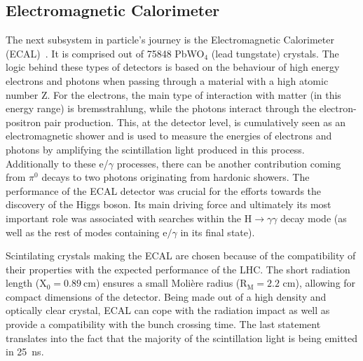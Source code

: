 \subsection{Electromagnetic Calorimeter}
\hspace{10pt} The next subsystem in particle's journey is the Electromagnetic Calorimeter (ECAL)~\cite{cms:paper}\cite{ECAL_performance}. It is comprised out of 75848 PbWO$_{\text{4}}$ (lead tungstate) crystals. The logic behind these types of detectors is based on the behaviour of high energy electrons and photons when passing through a material with a high atomic number Z. For the electrons, the main type of interaction with matter (in this energy range) is bremsstrahlung, while the photons interact through the electron-positron pair production. This, at the detector level, is cumulatively seen as an electromagnetic shower and is used to measure the energies of electrons and photons by amplifying the scintillation light produced in this process. Additionally to these e/$\gamma$ processes, there can be another contribution coming from $\pi^\text{0}$ decays to two photons originating from hardonic showers. The performance of the ECAL detector was crucial for the efforts towards the discovery of the Higgs boson. Its main driving force and ultimately its most important role was associated with searches within the $\text{H}\rightarrow \gamma\gamma$ decay mode (as well as the rest of modes containing $\text{e}/\gamma$ in its final state). 

\hspace{10pt} Scintilating crystals making the ECAL are chosen because of the compatibility of their properties with the expected performance of the LHC. The short radiation length (X$_\text{0}=\text{0.89}~\text{cm}$) ensures a small Moli\`ere radius (R$_\text{M}=\text{2.2~cm}$), allowing for compact dimensions of the detector. Being made out of a high density and optically clear crystal, ECAL can cope with the radiation impact as well as provide a compatibility with the bunch crossing time. The last statement translates into the fact that the majority of the scintillation light is being emitted in 25~ns. 

